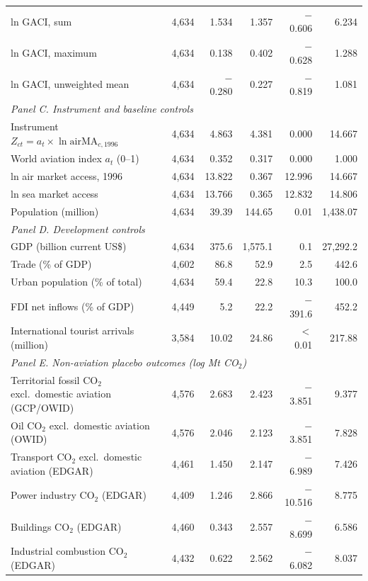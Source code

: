 \begin{table}[H]
{\begin{threeparttable}
\begin{tabular}{lrrrrr}
  ln GACI, sum & 4,634 & 1.534 & 1.357 & $-$0.606 & 6.234 \\
  ln GACI, maximum & 4,634 & 0.138 & 0.402 & $-$0.628 & 1.288 \\
  ln GACI, unweighted mean & 4,634 & $-$0.280 & 0.227 & $-$0.819 & 1.081 \\
\multicolumn{6}{l}{\textit{Panel C. Instrument and baseline controls}} \\
  Instrument $Z_{ct}=a_t\times\ln \mathrm{airMA}_{c,1996}$ & 4,634 & 4.863 & 4.381 & 0.000 & 14.667 \\
  World aviation index $a_t$ (0--1) & 4,634 & 0.352 & 0.317 & 0.000 & 1.000 \\
  ln air market access, 1996 & 4,634 & 13.822 & 0.367 & 12.996 & 14.667 \\
  ln sea market access & 4,634 & 13.766 & 0.365 & 12.832 & 14.806 \\
  Population (million) & 4,634 & 39.39 & 144.65 & 0.01 & 1,438.07 \\
\multicolumn{6}{l}{\textit{Panel D. Development controls}} \\
  GDP (billion current US\$) & 4,634 & 375.6 & 1,575.1 & 0.1 & 27,292.2 \\
  Trade (\% of GDP) & 4,602 & 86.8 & 52.9 & 2.5 & 442.6 \\
  Urban population (\% of total) & 4,634 & 59.4 & 22.8 & 10.3 & 100.0 \\
  FDI net inflows (\% of GDP) & 4,449 & 5.2 & 22.2 & $-$391.6 & 452.2 \\
  International tourist arrivals (million) & 3,584 & 10.02 & 24.86 & $<$0.01 & 217.88 \\
\multicolumn{6}{l}{\textit{Panel E. Non-aviation placebo outcomes (log Mt CO$_2$)}} \\
  Territorial fossil CO$_2$ excl.\ domestic aviation (GCP/OWID) & 4,576 & 2.683 & 2.423 & $-$3.851 & 9.377 \\
  Oil CO$_2$ excl.\ domestic aviation (OWID) & 4,576 & 2.046 & 2.123 & $-$3.851 & 7.828 \\
  Transport CO$_2$ excl.\ domestic aviation (EDGAR) & 4,461 & 1.450 & 2.147 & $-$6.989 & 7.426 \\
  Power industry CO$_2$ (EDGAR) & 4,409 & 1.246 & 2.866 & $-$10.516 & 8.775 \\
  Buildings CO$_2$ (EDGAR) & 4,460 & 0.343 & 2.557 & $-$8.699 & 6.586 \\
  Industrial combustion CO$_2$ (EDGAR) & 4,432 & 0.622 & 2.562 & $-$6.082 & 8.037 \\

\end{tabular}
\end{threeparttable}}
\end{table}
